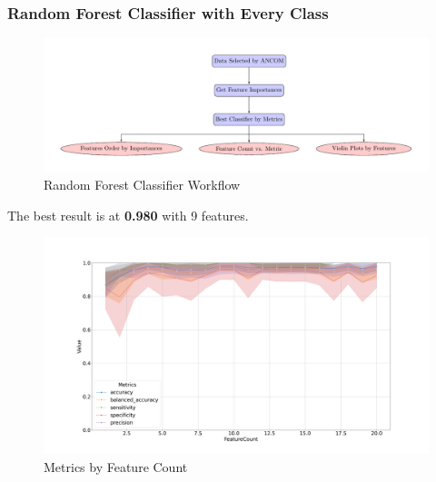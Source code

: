 \documentclass{beamer}
\begin{document}
    \begin{frame}[allowframebreaks]
        \frametitle{Random Forest Classifier with Every Class}

        \begin{figure}
            \includegraphics[width=0.8 \linewidth]{figures/RandomForest/whole.pdf}
            \caption{Random Forest Classifier Workflow}
        \end{figure}

        The best result is at \textbf{0.980} with 9 features.

        \begin{figure}
            \includegraphics[width=0.8 \linewidth]{figures/RandomForest/ANCOM.DADA2.homd/metrics.png}
            \caption{Metrics by Feature Count}
        \end{figure}


\end{frame}
\end{document}
